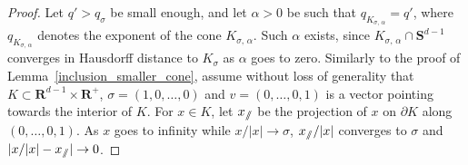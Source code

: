\documentclass[AHL,Unicode,longabstracts,published]{cedram}
\newcommand{\bfS}{\mathbf{S}}
\newcommand{\bfR}{\mathbf{R}}
\newcommand{\sslash}{\slash\mkern-6.4mu\slash}
\begin{document}
\begin{proof}
Let $q'>q_{\sigma}$ be small enough, and let $\alpha>0$ be such that $q_{K_{\sigma,\,\alpha}}=q'$, where $q_{K_{\sigma,\,\alpha}}$ denotes the exponent of the cone $K_{\sigma,\,\alpha}$. Such $\alpha$ exists, since $K_{\sigma,\,\alpha}\cap \bfS^{d-1}$ converges in Hausdorff distance to $K_{\sigma}$ as $\alpha$ goes to zero. Similarly to the proof of Lemma~\ref{inclusion_smaller_cone}, assume without loss of generality that $K\subset \bfR^{d-1}\times \bfR^{+}$, $\sigma=(1,0,\ldots,0)$ and $v=(0,\ldots,0,1)$ is a vector pointing towards the interior of $K$. For $x\in K$, let $x_{\sslash}$ be the projection of $x$ on $\partial K$ along $(0,\ldots,0,1)$. As $x$ goes to infinity while $x/| x|\rightarrow \sigma$, $x_{\sslash}/| x|$ converges to $\sigma$ and $| x/| x|-x_{\sslash}|\rightarrow 0$.


\end{proof}
\end{document}
